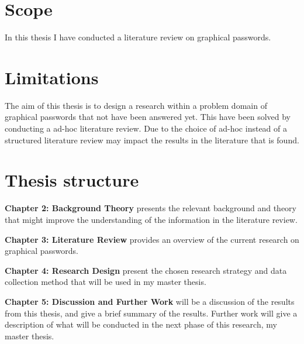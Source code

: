   \section{Scope}

    In this thesis I have conducted a literature review on graphical passwords. 


  \section{Limitations}

    The aim of this thesis is to design a research within a problem domain of graphical passwords that not have been answered yet. This have been solved by conducting a ad-hoc literature review. Due to the choice of ad-hoc instead of a structured literature review may impact the results in the literature that is found. 


  \section{Thesis structure}

    {\bf Chapter 2: Background Theory} presents the relevant background and theory that might improve the understanding of the information in the literature review. 

    {\bf Chapter 3: Literature Review} provides an overview of the current research on graphical passwords. 

    {\bf Chapter 4: Research Design} present the chosen research strategy and data collection method that will be used in my master thesis. 

    {\bf Chapter 5: Discussion and Further Work} will be a discussion of the results from this thesis, and give a brief summary of the results. Further work will give a description of what will be conducted in the next phase of this research, my master thesis.  





